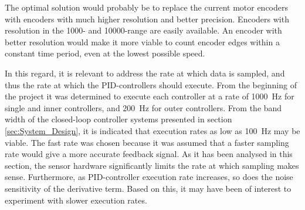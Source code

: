 \documentclass[../../main.tex]{subfiles}
\begin{document}



The optimal solution would probably be to replace the current motor encoders with encoders with much higher resolution and better precision. Encoders with resolution in the 1000- and 10000-range are easily available. An encoder with better resolution would make it more viable to count encoder edges within a constant time period, even at the lowest possible speed.

In this regard, it is relevant to address the rate at which data is sampled, and thus the rate at which the PID-controllers should execute. From the beginning of the project it was determined to execute each controller at a rate of \SI{1000}{\hertz} for single and inner controllers, and \SI{200}{\hertz} for outer controllers. From the band width of the closed-loop controller systems presented in section \ref{sec:System_Design}, it is indicated that execution rates as low as \SI{100}{\hertz} may be viable. The fast rate was chosen because it was assumed that a faster sampling rate would give a more accurate feedback signal. As it has been analysed in this section, the sensor hardware significantly limits the rate at which sampling makes sense. Furthermore, as PID-controller execution rate increases, so does the noise sensitivity of the derivative term. Based on this, it may have been of interest to experiment with slower execution rates.
\end{document}
